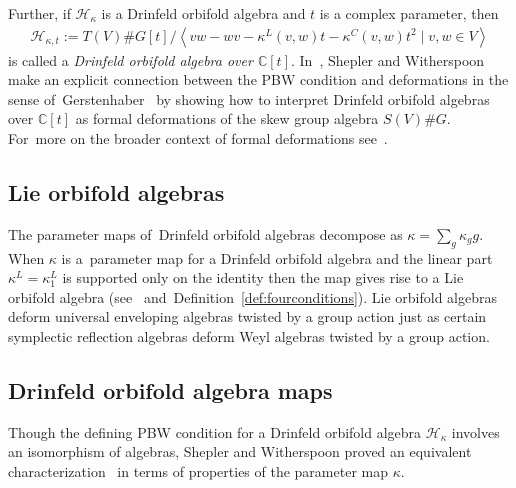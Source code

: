 \documentclass[10pt,a4paper]{amsart}
\numberwithin{equation}{section}
\newcommand{\standout}[1]{\textit{#1}} %
\begin{document}
Further, if $\mathcal{H}_{\kappa}$ is a Drinfeld orbifold algebra and $t$ is a complex parameter,
then
\begin{gather*}
\mathcal{H}_{\kappa,t}:=T(V)\#G[t]/\left\langle vw-wv-\kappa^L(v,w)t-\kappa^C(v,w)t^2\mid v,w\in V\right\rangle
\end{gather*}
is called a \standout{Drinfeld orbifold algebra over $\mathbb{C}[t]$}.
In~\cite[Theorem~2.1]{SWorbifold}, Shepler and Witherspoon make an explicit
connection between the PBW condition and deformations in the sense of~Ger\-s\-tenhaber~\cite{GerstenhaberSchack} by showing how to interpret Drinfeld orbifold
algebras over $\mathbb{C}[t]$ as formal defor\-ma\-tions of the skew group algebra
$S(V)\# G$. For~more on the broader context of formal deformations
see~\cite[Section~4]{FGK}.

\subsection{Lie orbifold algebras}%
The parameter maps of~Drinfeld orbifold algebras decompose as
$\kappa=\sum_{g} \kappa_g g$. When $\kappa$ is a~para\-meter map for a Drinfeld orbifold algebra and the linear part $\kappa^L=\kappa^L_1$
is supported only on the identity then the map gives rise to a Lie orbifold algebra
(see~\cite[Section~4]{SWorbifold} and~Definition~\ref{def:fourconditions}).
Lie orbifold algebras deform universal enveloping
algebras twisted by a group action just as certain symplectic reflection algebras
deform Weyl algebras twisted by a group action.

\subsection{Drinfeld orbifold algebra maps}
Though the defining PBW condition for a Drinfeld orbifold algebra $\mathcal{H}_{\kappa}$ involves an isomorphism of algebras, Shepler and Witherspoon proved an equivalent characterization~\cite[Theorem~3.1]{SWorbifold} in terms of properties of the parameter map $\kappa$.
\end{document}

